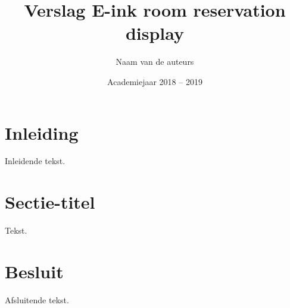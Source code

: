 \documentclass[a4paper,kul]{kulakarticle} %
\date{Academiejaar 2018 -- 2019}
\title{Verslag E-ink room reservation display}
\author{Naam van de auteurs}
\begin{document}
\maketitle

\section*{Inleiding}

Inleidende tekst.

\section{Sectie-titel}

Tekst.

\section*{Besluit}

Afsluitende tekst.
\end{document}
